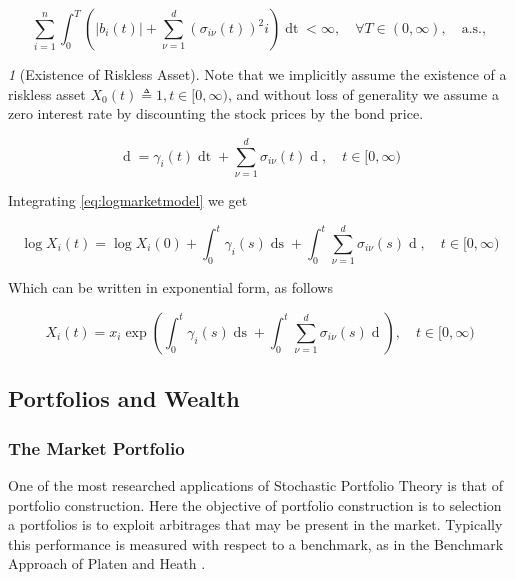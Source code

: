 \documentclass[british]{amsart}
\numberwithin{equation}{section}
\numberwithin{figure}{section}
\theoremstyle{plain}
\theoremstyle{definition}
\theoremstyle{plain}
\theoremstyle{plain}
\theoremstyle{plain}
\theoremstyle{remark}
\newtheorem{rem}[thm]{\protect\remarkname}
\providecommand{\remarkname}{Remark}
\renewcommand{\d}[1]{\mathop{\mathrm{d}{#1}}}
\newcommand{\ranget}{t\in[0,\infty)}
\newcommand{\defeq}{\mathop{\triangleq}}
\newcommand{\almostsurely}{\text{a.s.}}
\begin{document}
\begin{equation}
	\sum_{i=1}^{n}\int_{0}^{T}
	\left(
		\left| b_{i}(t) \right| + 
		\sum_{\nu=1}^{d}(\sigma_{i\nu}(t))^{2}i
	\right)
	\d{t} < \infty,\quad \forall T \in (0,\infty), \quad \almostsurely,
\end{equation}

\begin{rem} [Existence of Riskless Asset]
	Note that we implicitly assume the existence of a riskless asset 
	$X_{0}(t)\defeq 1,\ranget$, and without loss of generality we assume a zero 
	interest rate by discounting the stock prices by the bond price.
\end{rem}


\begin{equation}
	\d{\log X_{i}(t)}=\gamma_{i}(t)\d{t} + \sum_{\nu=1}^{d} 
	\sigma_{i\nu}(t){\d{W_{\nu}(t)}}, \quad \ranget
	\label{eq:logmarketmodel}
\end{equation}

Integrating \ref{eq:logmarketmodel} we get

\begin{equation}
	\log X_{i}(t) = \log X_{i}(0) + \int_{0}^{t} \gamma_{i}(s)\d{s} + 
	\int_{0}^{t} \sum_{\nu=1}^{d} \sigma_{i\nu}(s){\d{W_{\nu}(s)}}, \quad 
	\ranget
\end{equation}

Which can be written in exponential form, as follows

\begin{equation}
	X_{i}(t) = x_{i} \exp{ \left(
			\int_{0}^{t} \gamma_{i}(s)\d{s} + \int_{0}^{t} 
			\sum_{\nu=1}^{d} \sigma_{i\nu}(s){\d{W_{\nu}(s)}} 
			\right)
		}, \quad \ranget
\end{equation}


\subsection{Portfolios and Wealth}

\subsubsection{The Market Portfolio}
One of the most researched applications of Stochastic Portfolio Theory is that 
of portfolio construction. Here the objective of portfolio construction is to 
selection a portfolios is to exploit arbitrages that may be present in the 
market. Typically this performance is measured with respect to a benchmark, as 
in the Benchmark Approach of Platen and Heath \cite{platen2006}.
\end{document}
